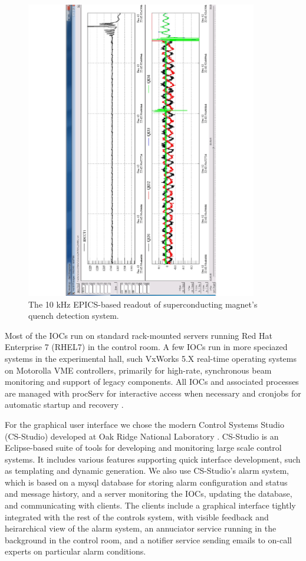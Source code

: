 \begin{figure}[t]\centering
\includegraphics[width=0.9\textwidth]{img/tordaq}
\caption{The 10 kHz EPICS-based readout of superconducting magnet's quench detection system.\label{fig:tordaq}}
\end{figure}

Most of the IOCs run on standard rack-mounted servers running Red Hat Enterprise 7 (RHEL7) in the control room.  A few IOCs run in more speciazed systems in the experimental hall, such VxWorks 5.X real-time operating systems on Motorolla VME controllers, primarily for high-rate, synchronous beam monitoring and support of legacy components.  All IOCs and associated processes are managed with procServ for interactive access when necessary and cronjobs for automatic startup and recovery \cite{procserv-website}.

For the graphical user interface we chose the modern Control Systems Studio (CS-Studio) developed at Oak Ridge National Laboratory \cite{css-website}.   CS-Studio is an Eclipse-based suite of tools for developing and monitoring large scale control systems.  It includes various features supporting quick interface development, such as templating and dynamic generation.  We also use CS-Studio's alarm system, which is based on a mysql database for storing alarm configuration and status and message history, and a server monitoring the IOCs, updating the database, and communicating with clients.  The clients include a graphical interface tightly integrated with the rest of the controls system, with visible feedback and heirarchical view of the alarm system, an annuciator service running in the background in the control room, and a notifier service sending emails to on-call experts on particular alarm conditions.

